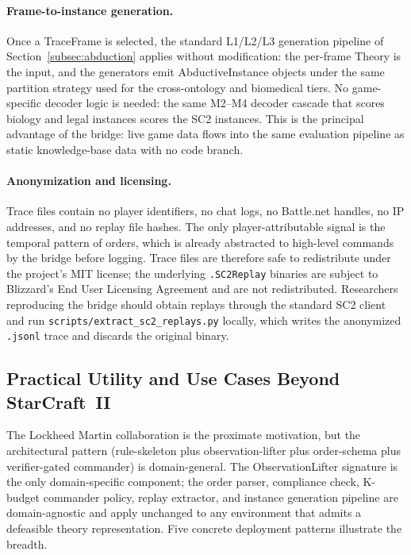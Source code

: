 \documentclass{article}
\theoremstyle{definition}
\begin{document}
\paragraph{Frame-to-instance generation.} Once a TraceFrame is selected, the standard L1/L2/L3 generation pipeline of Section~\ref{subsec:abduction} applies without modification: the per-frame Theory is the input, and the generators emit AbductiveInstance objects under the same partition strategy used for the cross-ontology and biomedical tiers. No game-specific decoder logic is needed: the same M2--M4 decoder cascade that scores biology and legal instances scores the SC2 instances. This is the principal advantage of the bridge: live game data flows into the same evaluation pipeline as static knowledge-base data with no code branch.

\paragraph{Anonymization and licensing.} Trace files contain no player identifiers, no chat logs, no Battle.net handles, no IP addresses, and no replay file hashes. The only player-attributable signal is the temporal pattern of orders, which is already abstracted to high-level commands by the bridge before logging. Trace files are therefore safe to redistribute under the project's MIT license; the underlying \texttt{.SC2Replay} binaries are subject to Blizzard's End User Licensing Agreement and are not redistributed. Researchers reproducing the bridge should obtain replays through the standard SC2 client and run \texttt{scripts/extract\_sc2\_replays.py} locally, which writes the anonymized \texttt{.jsonl} trace and discards the original binary.


\subsection{Practical Utility and Use Cases Beyond StarCraft~II}\label{subsec:sc2live-utility}

The Lockheed Martin collaboration is the proximate motivation, but the architectural pattern (rule-skeleton plus observation-lifter plus order-schema plus verifier-gated commander) is domain-general. The ObservationLifter signature is the only domain-specific component; the order parser, compliance check, K-budget commander policy, replay extractor, and instance generation pipeline are domain-agnostic and apply unchanged to any environment that admits a defeasible theory representation. Five concrete deployment patterns illustrate the breadth.
\end{document}
